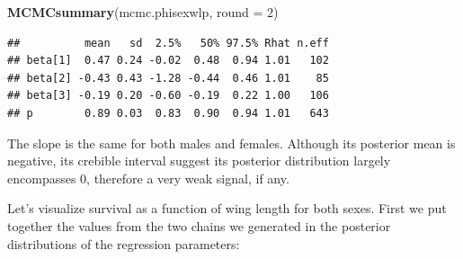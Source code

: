 \documentclass[
  12pt,
]{krantz}
\newenvironment{Shaded}{\begin{snugshade}}{\end{snugshade}}
\newcommand{\AttributeTok}[1]{\textcolor[rgb]{0.13,0.29,0.53}{#1}}
\newcommand{\CommentTok}[1]{\textcolor[rgb]{0.56,0.35,0.01}{\textit{#1}}}
\newcommand{\DecValTok}[1]{\textcolor[rgb]{0.00,0.00,0.81}{#1}}
\newcommand{\FunctionTok}[1]{\textcolor[rgb]{0.13,0.29,0.53}{\textbf{#1}}}
\newcommand{\NormalTok}[1]{#1}
\newcommand{\OtherTok}[1]{\textcolor[rgb]{0.56,0.35,0.01}{#1}}
\newcommand{\SpecialCharTok}[1]{\textcolor[rgb]{0.81,0.36,0.00}{\textbf{#1}}}
\newcommand{\StringTok}[1]{\textcolor[rgb]{0.31,0.60,0.02}{#1}}
\begin{document}
\begin{Shaded}
\begin{Highlighting}[]
\FunctionTok{MCMCsummary}\NormalTok{(mcmc.phisexwlp, }\AttributeTok{round =} \DecValTok{2}\NormalTok{)}
\end{Highlighting}
\end{Shaded}

\begin{verbatim}
##          mean   sd  2.5%   50% 97.5% Rhat n.eff
## beta[1]  0.47 0.24 -0.02  0.48  0.94 1.01   102
## beta[2] -0.43 0.43 -1.28 -0.44  0.46 1.01    85
## beta[3] -0.19 0.20 -0.60 -0.19  0.22 1.00   106
## p        0.89 0.03  0.83  0.90  0.94 1.01   643
\end{verbatim}

The slope is the same for both males and females. Although its posterior mean is negative, its crebible interval suggest its posterior distribution largely encompasses 0, therefore a very weak signal, if any.

Let's visualize survival as a function of wing length for both sexes. First we put together the values from the two chains we generated in the posterior distributions of the regression parameters:

\begin{Shaded}
\end{Shaded}
\end{document}
